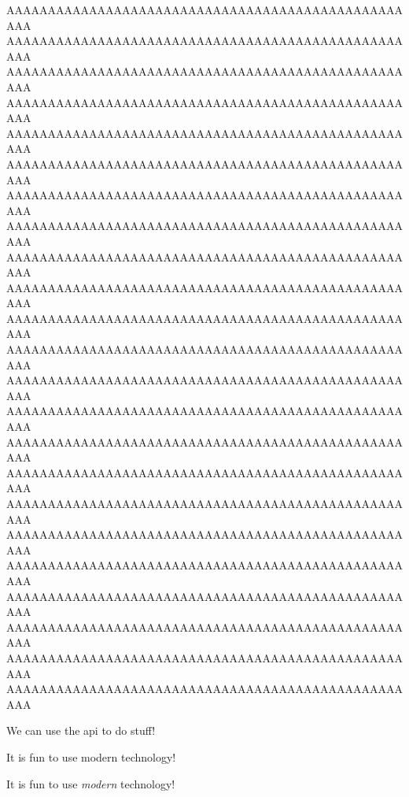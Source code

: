 \documentclass[final,11pt,baselinegrid]{../../uit-thesis}
\begin{document}
AAAAAAAAAAAAAAAAAAAAAAAAAAAAAAAAAAAAAAAAAAAAAAAAAAA\newline
%
AAAAAAAAAAAAAAAAAAAAAAAAAAAAAAAAAAAAAAAAAAAAAAAAAAA\newline
AAAAAAAAAAAAAAAAAAAAAAAAAAAAAAAAAAAAAAAAAAAAAAAAAAA\newline
AAAAAAAAAAAAAAAAAAAAAAAAAAAAAAAAAAAAAAAAAAAAAAAAAAA\newline
AAAAAAAAAAAAAAAAAAAAAAAAAAAAAAAAAAAAAAAAAAAAAAAAAAA\newline
AAAAAAAAAAAAAAAAAAAAAAAAAAAAAAAAAAAAAAAAAAAAAAAAAAA\newline
AAAAAAAAAAAAAAAAAAAAAAAAAAAAAAAAAAAAAAAAAAAAAAAAAAA\newline
AAAAAAAAAAAAAAAAAAAAAAAAAAAAAAAAAAAAAAAAAAAAAAAAAAA\newline
AAAAAAAAAAAAAAAAAAAAAAAAAAAAAAAAAAAAAAAAAAAAAAAAAAA\newline
AAAAAAAAAAAAAAAAAAAAAAAAAAAAAAAAAAAAAAAAAAAAAAAAAAA\newline
AAAAAAAAAAAAAAAAAAAAAAAAAAAAAAAAAAAAAAAAAAAAAAAAAAA\newline
AAAAAAAAAAAAAAAAAAAAAAAAAAAAAAAAAAAAAAAAAAAAAAAAAAA\newline
AAAAAAAAAAAAAAAAAAAAAAAAAAAAAAAAAAAAAAAAAAAAAAAAAAA\newline
AAAAAAAAAAAAAAAAAAAAAAAAAAAAAAAAAAAAAAAAAAAAAAAAAAA\newline
AAAAAAAAAAAAAAAAAAAAAAAAAAAAAAAAAAAAAAAAAAAAAAAAAAA\newline
AAAAAAAAAAAAAAAAAAAAAAAAAAAAAAAAAAAAAAAAAAAAAAAAAAA\newline
AAAAAAAAAAAAAAAAAAAAAAAAAAAAAAAAAAAAAAAAAAAAAAAAAAA\newline
AAAAAAAAAAAAAAAAAAAAAAAAAAAAAAAAAAAAAAAAAAAAAAAAAAA\newline
AAAAAAAAAAAAAAAAAAAAAAAAAAAAAAAAAAAAAAAAAAAAAAAAAAA\newline
AAAAAAAAAAAAAAAAAAAAAAAAAAAAAAAAAAAAAAAAAAAAAAAAAAA\newline
AAAAAAAAAAAAAAAAAAAAAAAAAAAAAAAAAAAAAAAAAAAAAAAAAAA\newline
AAAAAAAAAAAAAAAAAAAAAAAAAAAAAAAAAAAAAAAAAAAAAAAAAAA\newline
AAAAAAAAAAAAAAAAAAAAAAAAAAAAAAAAAAAAAAAAAAAAAAAAAAA\newline
\lipsum[1]
\lipsum[1]
\lipsum[1-7]



We can use the \ac{api} to do stuff!

It is fun to use modern  technology!

It is fun to use \emph{modern } technology!
\end{document}
